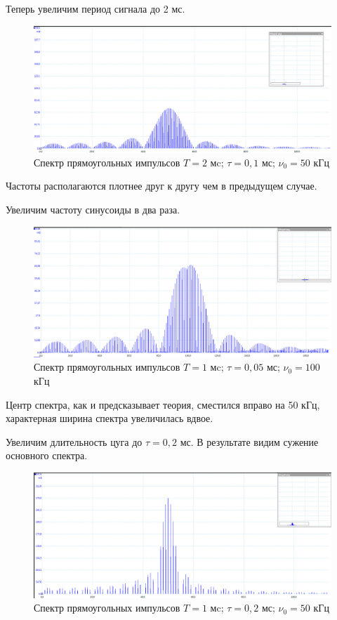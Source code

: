 \documentclass[a4paper,12pt]{article}
\begin{document}
Теперь увеличим период сигнала до 2 мс.
\begin{figure}[H]\label{fig: 50kHz_2ms_5N}
    \centering
    \includegraphics[width =\textwidth]{50kHz_2ms_5N.png}
    \caption{Спектр прямоугольных импульсов $T = 2$ мc; $\tau = 0,1$ мс; $\nu_0 = 50$ кГц}
\end{figure}
Частоты располагаются плотнее друг к другу чем в предыдущем случае.

Увеличим частоту синусоиды в два раза.
\begin{figure}[H]\label{fig: 100kHz_1ms_5N}
    \centering
    \includegraphics[width =\textwidth]{100kHz_1ms_5N.png}
        \caption{Спектр прямоугольных импульсов $T = 1$ мc; $\tau = 0,05$ мс; $\nu_0 = 100$ кГц}
\end{figure}
Центр спектра, как и предсказывает теория, сместился вправо на 50 кГц, характерная ширина спектра увеличилась вдвое. 

Увеличим длительность цуга до $\tau = 0,2$ мс. В результате видим сужение основного спектра.  
\begin{figure}[H]\label{fig: 50kHz_1ms_10N}
    \centering
    \includegraphics[width =\textwidth]{50kHz_1ms_10N.png}
        \caption{Спектр прямоугольных импульсов $T = 1$ мc; $\tau = 0,2$ мс; $\nu_0 = 50$ кГц}
\end{figure}
\end{document}
